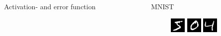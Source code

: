 \documentclass[final]{beamer}
\newlength{\sepwid}
\newlength{\onecolwid}
\newlength{\threecolwid}
\begin{document}
\begin{frame}[t]
\begin{columns}[t]
\begin{column}{\onecolwid}
\begin{block}{Activation- and error function}
\end{block}


\end{column} %


\begin{column}{\sepwid}\end{column} %


\begin{column}{\threecolwid}

\begin{columns}[T, totalwidth=\threecolwid] %


\begin{column}{\onecolwid} %
\begin{block}{MNIST}

\begin{figure}

\centering
\includegraphics[width=0.2\linewidth]{graphics/reconstructions/mnist/input_00.png}
\includegraphics[width=0.2\linewidth]{graphics/reconstructions/mnist/input_01.png}
\includegraphics[width=0.2\linewidth]{graphics/reconstructions/mnist/input_02.png}


\end{figure}
\end{block}
\end{column}
\end{columns}
\end{column}
\end{columns}
\end{frame}
\end{document}
